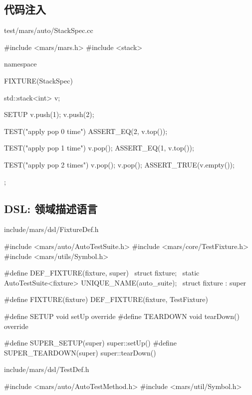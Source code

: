 \begin{content}

\subsection{代码注入}

\begin{nodiff}{test/mars/auto/StackSpec.cc}
 \begin{c++}
#include <mars/mars.h>
#include <stack>

namespace {
  FIXTURE(StackSpec) {
    std::stack<int> v;

    SETUP {
      v.push(1);
      v.push(2);
    }

    TEST("apply pop 0 time") {
      ASSERT_EQ(2, v.top());
    }

    TEST("apply pop 1 time") {
      v.pop();
      ASSERT_EQ(1, v.top());
    }

    TEST("apply pop 2 times") {
      v.pop();
      v.pop();
      ASSERT_TRUE(v.empty());
    }
  };
}
 \end{c++}
\end{nodiff}

\subsection{DSL: 领域描述语言}

\begin{nodiff}{include/mars/dsl/FixtureDef.h}
 \begin{c++}
#include <mars/auto/AutoTestSuite.h>
#include <mars/core/TestFixture.h>
#include <mars/utils/Symbol.h>

#define DEF_FIXTURE(fixture, super)                          \
struct fixture;                                              \
static AutoTestSuite<fixture> UNIQUE_NAME(auto_suite);  \
struct fixture : super

#define FIXTURE(fixture)  DEF_FIXTURE(fixture, TestFixture)

#define SETUP    void setUp override
#define TEARDOWN void tearDown() override

#define SUPER_SETUP(super)    super::setUp()
#define SUPER_TEARDOWN(super) super::tearDown()
 \end{c++}
\end{nodiff}

\begin{nodiff}{include/mars/dsl/TestDef.h}
 \begin{c++}
#include <mars/auto/AutoTestMethod.h>
#include <mars/util/Symbol.h>


\end{c++}
\end{nodiff}
\end{content}
